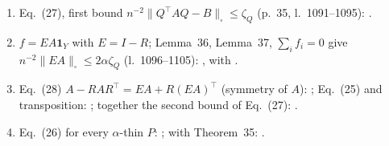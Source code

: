 \begin{enumerate}
\begin{enumerate}
  ; conjugation invariance by testing on $\pi(S)\times\pi(T)$.
  \item Eq.~(27), first bound $n^{-2}\|Q^\top AQ-B\|_\square\le\zeta_Q$ (p.~35, l.~1091--1095): .
  \item $f=EA\mathbf1_Y$ with $E=I-R$; Lemma~36, Lemma~37, $\sum_if_i=0$ give $n^{-2}\|EA\|_\square\le2\alpha\zeta_Q$
  (l.~1096--1105): , with .
  \item Eq.~(28) $A-RAR^\top=EA+R(EA)^\top$ (symmetry of $A$): ; Eq.~(25) and transposition:
  ; together the second bound of Eq.~(27): .
  \item Eq.~(26) for every $\alpha$-thin $P$: ; with Theorem~35: .
  \end{enumerate}
\end{enumerate}


